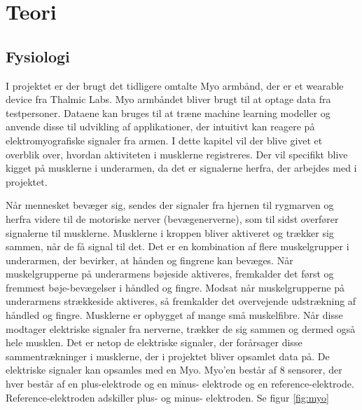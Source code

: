 \thispagestyle{fancy}
\chapter{Teori}
\label{chp:teori}

\section{Fysiologi}
\label{sec:fysiologi}
I projektet er der brugt det tidligere omtalte Myo armbånd, der er et wearable device fra Thalmic Labs. Myo armbåndet bliver brugt til at optage data fra testpersoner. Dataene kan bruges til at træne machine learning modeller og anvende disse til udvikling af applikationer, der intuitivt kan reagere på elektromyografiske signaler fra armen.
I dette kapitel vil der blive givet et overblik over, hvordan aktiviteten i musklerne registreres. Der vil specifikt blive kigget på musklerne i underarmen, da det er signalerne herfra, der arbejdes med i projektet.



Når mennesket bevæger sig, sendes der signaler fra hjernen til rygmarven og herfra videre til de motoriske nerver (bevægenerverne), som til sidst overfører signalerne til musklerne. Musklerne i kroppen bliver aktiveret og trækker sig sammen, når de få signal til det. Det er en kombination af flere muskelgrupper i underarmen, der bevirker, at hånden og fingrene kan bevæges. Når muskelgrupperne på underarmens bøjeside aktiveres, fremkalder det først og fremmest bøje-bevægelser i håndled og fingre. Modsat når muskelgrupperne på underarmens strækkeside aktiveres, så fremkalder det overvejende udstrækning af håndled og fingre. Musklerne er opbygget af mange små muskelfibre. Når disse modtager elektriske signaler fra nerverne, trækker de sig sammen og dermed også hele musklen. Det er netop de elektriske signaler, der forårsager disse sammentrækninger i musklerne, der i projektet bliver opsamlet data på. De elektriske signaler kan opsamles med en Myo. Myo'en består af 8 sensorer, der hver består af en plus-elektrode og en minus- elektrode og en reference-elektrode. Reference-elektroden adskiller plus- og minus- elektroden. Se figur \ref{fig:myo}

